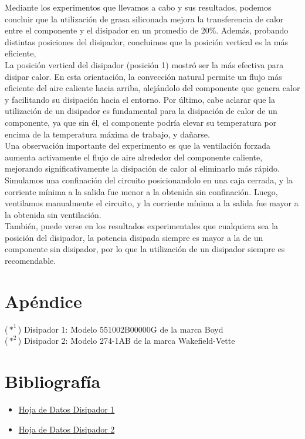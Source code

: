 \documentclass[conference]{IEEEtran}
\begin{document}
    Mediante los experimentos que llevamos a cabo y sus resultados, podemos concluir que la utilización de grasa 
    siliconada mejora la transferencia de calor entre el componente y el disipador en un promedio de 20\%. Además,
    probando distintas posiciones del disipador, concluimos que la posición vertical es la más eficiente,
    \\La posición vertical del disipador (posición 1) mostró ser la más efectiva para disipar calor. En esta orientación, 
    la convección natural permite un flujo más eficiente del aire caliente hacia arriba, alejándolo del componente que 
    genera calor y facilitando su disipación hacia el entorno. Por último, cabe aclarar que la utilización de un
    disipador es fundamental para la disipación de calor de un componente, ya que sin él, el componente podría elevar
    su temperatura por encima de la temperatura máxima de trabajo, y dañarse. \\Una observación importante del experimento
    es que la ventilación forzada aumenta activamente el flujo de aire alrededor del componente caliente, mejorando 
    significativamente la disipación de calor al eliminarlo más rápido. Simulamos una confinación del circuito posicionandolo
    en una caja cerrada, y la corriente mínima a la salida fue menor a la obtenida sin confinación. Luego, ventilamos
    manualmente el circuito, y la corriente mínima a la salida fue mayor a la obtenida sin ventilación.
    \\También, puede verse en los resultados
    experimentales que cualquiera sea la posición del disipador, la potencia disipada siempre es mayor a la de un
    componente sin disipador, por lo que la utilización de un disipador siempre es recomendable.

    \section{Apéndice}
    ($*^1$) Disipador 1: Modelo 551002B00000G de la marca Boyd \\
    ($*^2$) Disipador 2: Modelo 274-1AB de la marca Wakefield-Vette \\
    \section{Bibliografía}
    \begin{itemize}
        \item \href{https://www.digikey.com/en/products/detail/wakefield-vette/274-1AB/340321}{Hoja de Datos Disipador 1}
        \item \href{https://es.farnell.com/boyd/551002b00000g/heat-sink/dp/1339511}{Hoja de Datos Disipador 2}
    \end{itemize}
\end{document}
